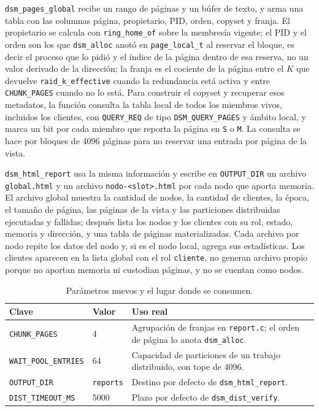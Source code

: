 \documentclass[11pt,spanish]{article}
\begin{document}
\texttt{dsm\_pages\_global} recibe un rango de páginas y un búfer de texto, y arma una tabla con las columnas página, propietario, PID, orden, copyset y franja. El propietario se calcula con \texttt{ring\_home\_of} sobre la membresía vigente; el PID y el orden son los que \texttt{dsm\_alloc} anotó en \texttt{page\_local\_t} al reservar el bloque, es decir el proceso que lo pidió y el índice de la página dentro de esa reserva, no un valor derivado de la dirección; la franja es el cociente de la página entre el $K$ que devuelve \texttt{raid\_k\_effective} cuando la redundancia está activa y entre \texttt{CHUNK\_PAGES} cuando no lo está. Para construir el copyset y recuperar esos metadatos, la función consulta la tabla local de todos los miembros vivos, incluidos los clientes, con \texttt{QUERY\_REQ} de tipo \texttt{DSM\_QUERY\_PAGES} y ámbito local, y marca un bit por cada miembro que reporta la página en \texttt{S} o \texttt{M}. La consulta se hace por bloques de 4096 páginas para no reservar una entrada por página de la vista.

\texttt{dsm\_html\_report} usa la misma información y escribe en \texttt{OUTPUT\_DIR} un archivo \texttt{global.html} y un archivo \texttt{nodo-<slot>.html} por cada nodo que aporta memoria. El archivo global muestra la cantidad de nodos, la cantidad de clientes, la época, el tamaño de página, las páginas de la vista y las particiones distribuidas ejecutadas y fallidas; después lista los nodos y los clientes con su rol, estado, memoria y dirección, y una tabla de páginas materializadas. Cada archivo por nodo repite los datos del nodo y, si es el nodo local, agrega sus estadísticas. Los clientes aparecen en la lista global con el rol \texttt{cliente}, no generan archivo propio porque no aportan memoria ni custodian páginas, y no se cuentan como nodos.

\begin{table}[H]
\centering
\small
\begin{tabularx}{\linewidth}{l l Y}
\toprule
\textbf{Clave} & \textbf{Valor} & \textbf{Uso real} \\
\midrule
\texttt{CHUNK\_PAGES} & 4 & Agrupación de franjas en \texttt{report.c}; el orden de página lo anota \texttt{dsm\_alloc}. \\
\texttt{WAIT\_POOL\_ENTRIES} & 64 & Capacidad de particiones de un trabajo distribuido, con tope de 4096. \\
\texttt{OUTPUT\_DIR} & \texttt{reports} & Destino por defecto de \texttt{dsm\_html\_report}. \\
\texttt{DIST\_TIMEOUT\_MS} & 5000 & Plazo por defecto de \texttt{dsm\_dist\_verify}. \\
\bottomrule
\end{tabularx}
\caption{Parámetros nuevos y el lugar donde se consumen.}
\label{tab:config_p2}
\end{table}
\end{document}

